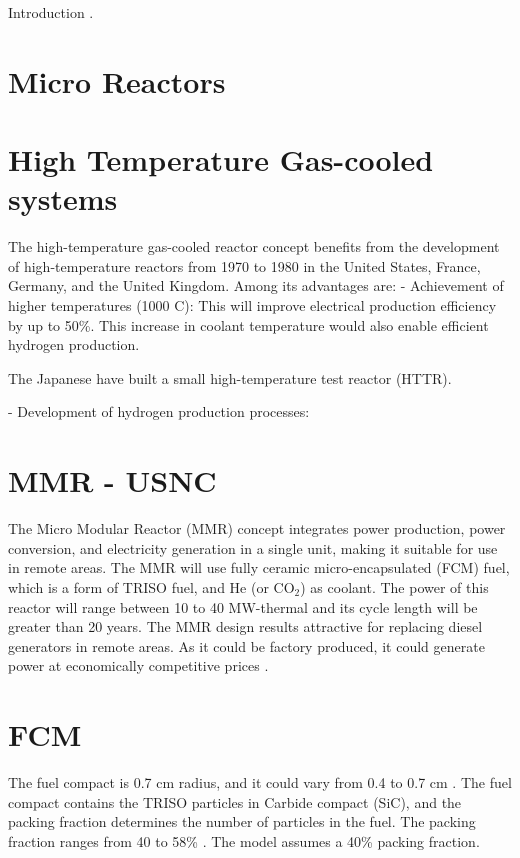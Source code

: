Introduction \cite{huff_extensions_2014}.

\section{Micro Reactors}

\section{High Temperature Gas-cooled systems}

The high-temperature gas-cooled reactor concept benefits from the development of high-temperature reactors from 1970 to 1980 in the United States, France, Germany, and the United Kingdom. 
Among its advantages are:
- Achievement of higher temperatures (1000 C): This will improve electrical production efficiency by up to 50\%. This increase in coolant temperature would also enable efficient hydrogen production.

The Japanese have built a small high-temperature test reactor (HTTR). 

- Development of hydrogen production processes:
\cite{france_gas-cooled_2006}

\section{MMR - USNC}

The Micro Modular Reactor (MMR) concept integrates power production, power conversion, and electricity generation in a single unit, making it suitable for use in remote areas. 
The MMR will use fully ceramic micro-encapsulated (FCM) fuel, which is a form of TRISO fuel, and He (or CO$_2$) as coolant.
The power of this reactor will range between 10 to 40 MW-thermal and its cycle length will be greater than 20 years.
The MMR design results attractive for replacing diesel generators in remote areas. As it could be factory produced, it could generate power at economically competitive prices \cite{hawari_development_2018}.

\section{FCM}

The fuel compact is 0.7 cm radius, and it could vary from 0.4 to 0.7 cm \cite{powers_fully_2013}. The fuel compact contains the TRISO particles in Carbide compact (SiC), and the packing fraction determines the number of particles in the fuel. The packing fraction ranges from 40 to 58\% \cite{powers_fully_2013}. The model assumes a 40\% packing fraction.

